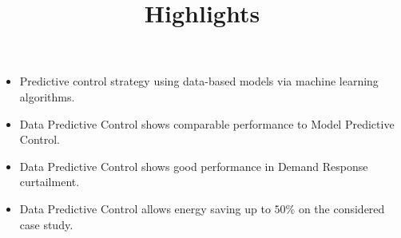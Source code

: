 \documentclass[12pt]{article}
\begin{document}
\title{Highlights}
\date{}
\maketitle 
\thispagestyle{empty}

\begin{itemize}
	\item Predictive control strategy using data-based models via machine learning algorithms.
	\item Data Predictive Control shows comparable performance to Model Predictive Control.
	\item Data Predictive Control shows good performance in Demand Response curtailment.
	\item Data Predictive Control allows energy saving up to $50\%$ on the considered case study.
\end{itemize}
\end{document}
